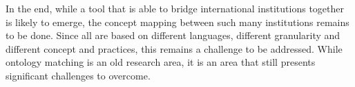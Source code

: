 \documentclass{amia}
\begin{document}
In the end, while a tool that is able to bridge international institutions together is likely to emerge, the concept mapping between such many institutions remains to be done. Since all are based on different languages, different granularity and different concept and practices, this remains a challenge to be addressed. While ontology matching is an old research area, it is an area that still presents significant challenges to overcome.



\makeatletter
\renewcommand{\@biblabel}[1]{\hfill #1.}
\makeatother






%
%




\end{document}
